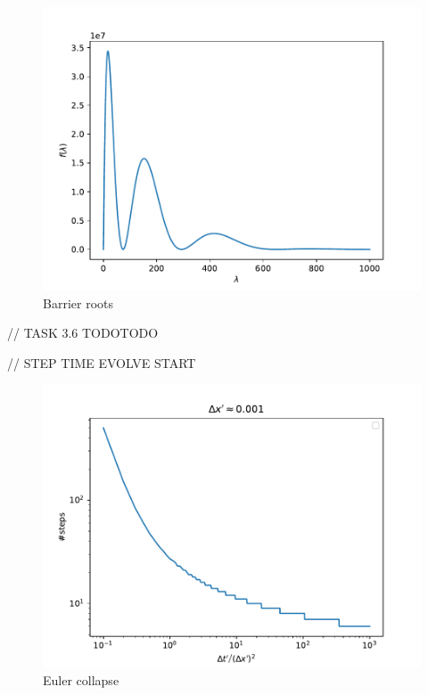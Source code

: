 \documentclass{article}
\begin{document}
\begin{figure}
    \includegraphics[width=\linewidth]{./media/f_of_lambda_roots.pdf}
    \caption{Barrier roots}
    \label{fig:barrier-roots}
\end{figure}

// TASK 3.6 TODOTODO

// STEP TIME EVOLVE START

\begin{figure}
    \includegraphics[width=\linewidth]{./media/steps_before_euler_collapse.pdf}
    \caption{Euler collapse}
    \label{fig:euler-collapse}
\end{figure}
\end{document}
